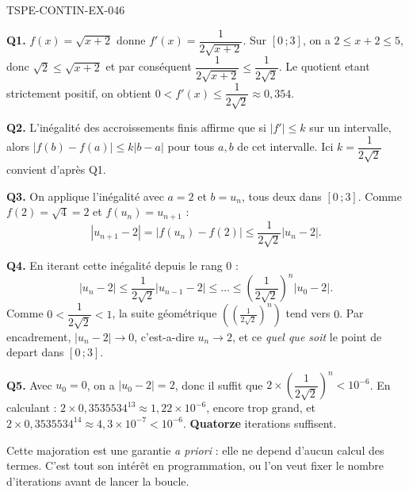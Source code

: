 \begin{corrige}{TSPE-CONTIN-EX-046}

\textbf{Q1.} $f(x) = \sqrt{x+2}$ donne $f'(x) = \dfrac{1}{2\sqrt{x+2}}$. Sur $[0\,;3]$, on a $2 \leq x+2 \leq 5$, donc $\sqrt2 \leq \sqrt{x+2}$ et par conséquent $\dfrac{1}{2\sqrt{x+2}} \leq \dfrac{1}{2\sqrt2}$. Le quotient etant strictement positif, on obtient $0 < f'(x) \leq \dfrac{1}{2\sqrt2} \approx 0{,}354$.

\textbf{Q2.} L'inégalité des accroissements finis affirme que si $\left|f'\right| \leq k$ sur un intervalle, alors $\left|f(b) - f(a)\right| \leq k\left|b-a\right|$ pour tous $a, b$ de cet intervalle. Ici $k = \dfrac{1}{2\sqrt2}$ convient d'après Q1.

\textbf{Q3.} On applique l'inégalité avec $a = 2$ et $b = u_n$, tous deux dans $[0\,;3]$. Comme $f(2) = \sqrt4 = 2$ et $f(u_n) = u_{n+1}$ :
\[ \left|u_{n+1} - 2\right| = \left|f(u_n) - f(2)\right| \leq \frac{1}{2\sqrt2}\left|u_n - 2\right|. \]

\textbf{Q4.} En iterant cette inégalité depuis le rang $0$ :
\[ \left|u_n - 2\right| \leq \frac{1}{2\sqrt2}\left|u_{n-1} - 2\right| \leq \dots \leq \left(\frac{1}{2\sqrt2}\right)^{n}\left|u_0 - 2\right|. \]
Comme $0 < \dfrac{1}{2\sqrt2} < 1$, la suite géométrique $\left(\left(\tfrac{1}{2\sqrt2}\right)^n\right)$ tend vers $0$. Par encadrement, $\left|u_n - 2\right| \to 0$, c'est-a-dire $u_n \to 2$, et ce \emph{quel que soit} le point de depart dans $[0\,;3]$.

\textbf{Q5.} Avec $u_0 = 0$, on a $\left|u_0 - 2\right| = 2$, donc il suffit que $2 \times \left(\dfrac{1}{2\sqrt2}\right)^{n} < 10^{-6}$. En calculant : $2 \times 0{,}3535534^{13} \approx 1{,}22 \times 10^{-6}$, encore trop grand, et $2 \times 0{,}3535534^{14} \approx 4{,}3 \times 10^{-7} < 10^{-6}$. \textbf{Quatorze} iterations suffisent.

Cette majoration est une garantie \emph{a priori} : elle ne depend d'aucun calcul des termes. C'est tout son intérêt en programmation, ou l'on veut fixer le nombre d'iterations avant de lancer la boucle.
\end{corrige}
